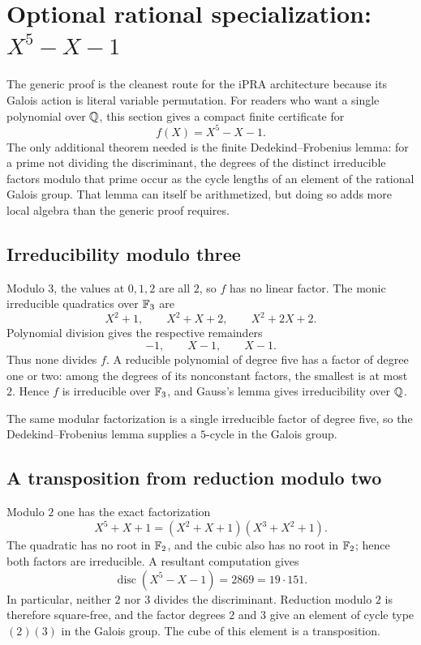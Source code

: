 \section{Optional rational specialization: \texorpdfstring{$X^5-X-1$}{X5-X-1}}
\label{sec:explicit-quintic}

The generic proof is the cleanest route for the iPRA architecture because its
Galois action is literal variable permutation.  For readers who want a single
polynomial over $\mathbb Q$, this section gives a compact finite certificate for
\[
 f(X)=X^5-X-1.
 \tag{E1}\label{eq:selmer5}
\]
The only additional theorem needed is the finite Dedekind--Frobenius lemma:
for a prime not dividing the discriminant, the degrees of the distinct
irreducible factors modulo that prime occur as the cycle lengths of an element
of the rational Galois group.  That lemma can itself be arithmetized, but doing
so adds more local algebra than the generic proof requires.

\subsection{Irreducibility modulo three}

Modulo $3$, the values at $0,1,2$ are all $2$, so $f$ has no linear factor.
The monic irreducible quadratics over $\mathbb F_3$ are
\[
 X^2+1,
 \qquad X^2+X+2,
 \qquad X^2+2X+2.
\]
Polynomial division gives the respective remainders
\[
 -1,
 \qquad X-1,
 \qquad X-1.
\]
Thus none divides $f$.  A reducible polynomial of degree five has a factor of
degree one or two: among the degrees of its nonconstant factors, the smallest
is at most $2$.  Hence $f$ is irreducible over $\mathbb F_3$, and Gauss's lemma gives
irreducibility over $\mathbb Q$.

The same modular factorization is a single irreducible factor of degree five,
so the Dedekind--Frobenius lemma supplies a $5$-cycle in the Galois group.

\subsection{A transposition from reduction modulo two}

Modulo $2$ one has the exact factorization
\[
 X^5+X+1
 =(X^2+X+1)(X^3+X^2+1).
 \tag{E2}\label{eq:mod2-factor}
\]
The quadratic has no root in $\mathbb F_2$, and the cubic also has no root in
$\mathbb F_2$; hence both factors are irreducible.  A resultant computation gives
\[
 \operatorname{disc}(X^5-X-1)=2869=19\cdot151.
 \tag{E3}\label{eq:selmer-disc}
\]
In particular, neither $2$ nor $3$ divides the discriminant.  Reduction
modulo $2$ is therefore square-free, and the factor degrees $2$ and $3$ give
an element of cycle type $(2)(3)$ in the Galois group.  The cube of this
element is a transposition.

